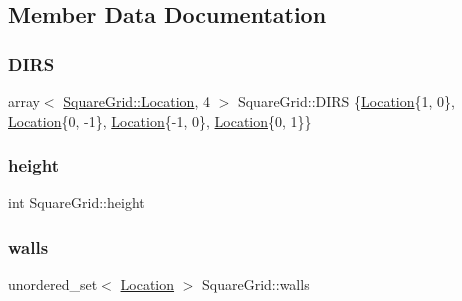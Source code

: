 \subsection{Member Data Documentation}
\mbox{\label{structSquareGrid_aac91cba6573640c545485ed054089c87}} 
\subsubsection{\texorpdfstring{D\+I\+RS}{DIRS}}
{\footnotesize\ttfamily array$<$ \mbox{\hyperlink{structSquareGrid_a2c9a2cbd3912aa48ac97289abc3f1c0f}{Square\+Grid\+::\+Location}}, 4 $>$ Square\+Grid\+::\+D\+I\+RS \{\mbox{\hyperlink{structSquareGrid_a2c9a2cbd3912aa48ac97289abc3f1c0f}{Location}}\{1, 0\}, \mbox{\hyperlink{structSquareGrid_a2c9a2cbd3912aa48ac97289abc3f1c0f}{Location}}\{0, -\/1\}, \mbox{\hyperlink{structSquareGrid_a2c9a2cbd3912aa48ac97289abc3f1c0f}{Location}}\{-\/1, 0\}, \mbox{\hyperlink{structSquareGrid_a2c9a2cbd3912aa48ac97289abc3f1c0f}{Location}}\{0, 1\}\}\hspace{0.3cm}{\ttfamily [static]}}

\mbox{\label{structSquareGrid_ad6b113fc3a49f5db5fbf9c8138e35634}} 
\subsubsection{\texorpdfstring{height}{height}}
{\footnotesize\ttfamily int Square\+Grid\+::height}

\mbox{\label{structSquareGrid_a1bc7e32bd195e42fd9685310d7ee65c5}} 
\subsubsection{\texorpdfstring{walls}{walls}}
{\footnotesize\ttfamily unordered\+\_\+set$<$ \mbox{\hyperlink{structSquareGrid_a2c9a2cbd3912aa48ac97289abc3f1c0f}{Location}} $>$ Square\+Grid\+::walls}

\mbox{\label{structSquareGrid_af5476cf49f0bb03d1e940adbc6e5febf}} 
